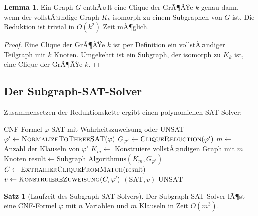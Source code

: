 ﻿\documentclass[a4paper,12pt]{article}
\theoremstyle{definition}
\newtheorem{satz}{Satz}
\newtheorem{lemma}{Lemma}
\begin{document}
\begin{lemma}
    Ein Graph $G$ enthÃ¤lt eine Clique der GrÃ¶ÃŸe $k$ genau dann, wenn der vollstÃ¤ndige Graph $K_k$ isomorph zu einem Subgraphen von $G$ ist. Die Reduktion ist trivial in $O(k^2)$ Zeit mÃ¶glich.
\end{lemma}

\begin{proof}
    Eine Clique der GrÃ¶ÃŸe $k$ ist per Definition ein vollstÃ¤ndiger Teilgraph mit $k$ Knoten. Umgekehrt ist ein Subgraph, der isomorph zu $K_k$ ist, eine Clique der GrÃ¶ÃŸe $k$.
\end{proof}

\subsection{Der Subgraph-SAT-Solver}

Zusammensetzen der Reduktionskette ergibt einen polynomiellen SAT-Solver:

\begin{algorithm}[h]
    \caption{Subgraph-SAT-Solver}\label{alg:subgraph-sat}
    \begin{algorithmic}[1]
        \Require CNF-Formel $\varphi$
        \Ensure SAT mit Wahrheitszuweisung oder UNSAT
        \State $\varphi' \gets \textsc{NormalizeToThreeSAT}(\varphi)$ 
        \State $G_{\varphi'} \gets \textsc{CliqueReduction}(\varphi')$ 
        \State $m \gets$ Anzahl der Klauseln von $\varphi'$
        \State $K_m \gets$ Konstruiere vollstÃ¤ndigen Graph mit $m$ Knoten 
        \State $\text{result} \gets \text{Subgraph Algorithmus}(K_m, G_{\varphi'})$ 
            \State $C \gets \textsc{ExtrahierCliqueFromMatch}(\text{result})$ 
            \State $v \gets \textsc{KonstruiereZuweisung}(C, \varphi')$ 
            \State \Return $(\text{SAT}, v)$
        \Else
            \State \Return $\text{UNSAT}$
        \EndIf
    \end{algorithmic}
\end{algorithm}

\begin{satz}[Laufzeit des Subgraph-SAT-Solvers]
    Der Subgraph-SAT-Solver lÃ¶st eine CNF-Formel $\varphi$ mit $n$ Variablen und $m$ Klauseln in Zeit $O(m^3)$.
\end{satz}
\end{document}
